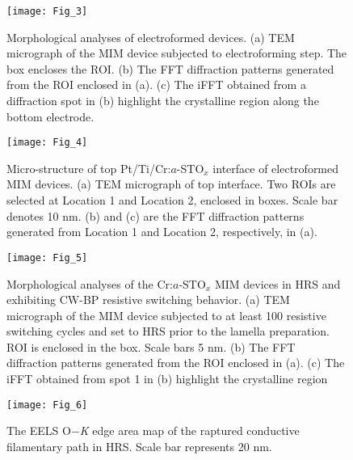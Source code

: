 \documentclass{osa-article}
\begin{document}
\begin{figure}[h!]
\centering\texttt{[image: Fig\_3]}
\caption{Morphological analyses of electroformed devices. (a) TEM micrograph of the MIM device subjected to electroforming step. The box encloses the ROI. (b) The FFT diffraction patterns generated from the ROI enclosed in (a). (c) The iFFT obtained from a diffraction spot in (b) highlight the crystalline region along the bottom electrode.}
\end{figure}
\begin{figure}[ht!]
\centering\texttt{[image: Fig\_4]}
\caption{Micro-structure of top Pt/Ti/Cr:$a$-STO$_{x}$ interface of electroformed MIM devices. (a) TEM micrograph of top interface. Two ROIs are selected at Location 1 and Location 2, enclosed in boxes. Scale bar denotes 10 nm. (b) and (c) are the FFT diffraction patterns generated from Location 1 and Location 2, respectively, in (a).}
\end{figure}
\begin{figure}[h!]
\centering\texttt{[image: Fig\_5]}
\caption{Morphological analyses of the Cr:$a$-STO$_{x}$ MIM devices in HRS and exhibiting CW-BP resistive switching behavior. (a) TEM micrograph of the MIM device subjected to at least 100 resistive switching cycles and set to HRS prior to the lamella preparation. ROI is enclosed in the box. Scale bars 5 nm. (b) The FFT diffraction patterns generated from the ROI enclosed in (a). (c) The iFFT obtained from spot 1 in (b) highlight the crystalline region}
\end{figure}
\begin{figure}[h!]
\centering\texttt{[image: Fig\_6]}
\caption{The EELS O$-$\textit{K} edge area map of the raptured conductive filamentary path in HRS. Scale bar represents 20 nm.}
\end{figure}
\end{document}
